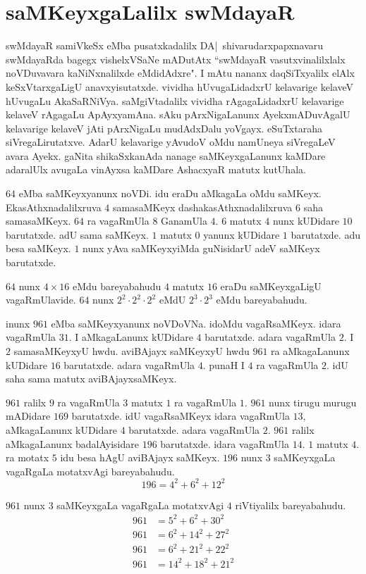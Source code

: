 \chapter{saMKeyxgaLalilx swMdayaR}

swMdayaR samiVkeSx eMba pusatxkadalilx DA|~shivarudarxpapxnavaru swMdayaRda bagegx vishelxVSaNe mADutAtx ``swMdayaR vasutxvinalilxlalx noVDuvavara kaNiNxnalilxde eMdidAdxre". I mAtu nananx daqSiTxyalilx elAlx keSxVtarxgaLigU anavxyisutatxde. vividha hUvugaLidadxrU kelavarige kelaveV hUvugaLu AkaSaRNiVya. saMgiVtadalilx vividha rAgagaLidadxrU kelavarige kelaveV rAgagaLu ApAyxyamAna. sAku pArxNigaLanunx AyekxmADuvAgalU kelavarige kelaveV jAti pArxNigaLu mudAdxDalu yoVgayx. eSuTxtaraha siVregaLirutatxve. AdarU kelavarige yAvudoV oMdu namUneya siVregaLeV avara Ayekx. gaNita shikaSxkanAda nanage saMKeyxgaLanunx kaMDare adaralUlx avugaLa vinAyxsa kaMDare AshacxyaR matutx kutUhala.

$64$ eMba saMKeyxyanunx noVDi. idu eraDu aMkagaLa oMdu saMKeyx. EkasAthxna\-dalilxruva $4$ samasaMKeyx dashakasAthxnadalilxruva $6$ saha samasaMKeyx. $64$ ra vagaRmUla $8$ GanamUla $4$. $6$ matutx $4$ nunx kUDidare $10$ barutatxde. adU sama saMKeyx. $1$ matutx $0$ yanunx kUDidare $1$ barutatxde. adu besa saMKeyx. $1$ nunx yAva saMKeyxyiMda guNisidarU adeV saMKeyx barutatxde.

$64$ nunx $4\times 16$ eMdu bareyabahudu $4$ matutx $16$ eraDu saMKeyxgaLigU vagaRmUlavide. $64$ nunx $2^2\cdot 2^2\cdot 2^2$ eMdU $2^3\cdot2^3$ eMdu bareyabahudu.

inunx $961$ eMba saMKeyxyanunx noVDoVNa. idoMdu vagaRsaMKeyx. idara vagaRmUla $31$. I aMkagaLanunx kUDidare $4$ barutatxde. adara vagaRmUla $2$. I $2$ samasaMKeyxyU hwdu. aviBAjayx saMKeyxyU hwdu $961$ ra aMkagaLanunx kUDidare $16$ barutatxde. adara vagaRmUla $4$. punaH I $4$ ra vagaRmUla $2$. idU saha sama matutx aviBAjayxsaMKeyx.

$961$ ralilx $9$ ra vagaRmUla $3$ matutx $1$ ra vagaRmUla $1$. $961$ nunx tirugu murugu mADidare $169$ barutatxde. idU vagaRsaMKeyx idara vagaRmUla $13$, aMka\-gaLanunx kUDidare $4$ barutatxde. adara vagaRmUla $2$. $961$ ralilx aMkagaLanunx badalAyi\-sidare $196$ barutatxde. idara vagaRmUla $14$. $1$ matutx $4$. ra motatx $5$ idu besa hAgU aviBAjayx saMKeyx. $196$ nunx $3$ saMKeyxgaLa vagaRgaLa motatxvAgi bareyabahudu.
$$
196 = 4^2+6^2+12^2
$$

$961$ nunx $3$ saMKeyxgaLa vagaRgaLa motatxvAgi $4$ riVtiyalilx bareyabahudu.
\begin{align*}
961 &= 5^2+6^2+30^2\\
961 &= 6^2+14^2+27^2\\
961 &= 6^2+21^2+22^2\\
961 &= 14^2+18^2+21^2
\end{align*}

